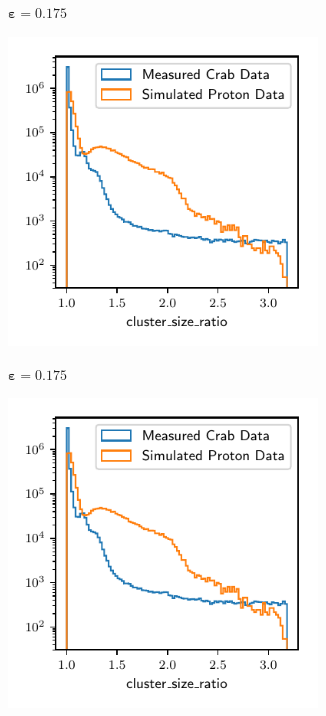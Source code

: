 \begin{figure}
\begin{subfigure}{0.5\textwidth}
  \end{subfigure}
  \begin{subfigure}{0.5\textwidth}
    \centering
    $\symbf{\varepsilon = 0.175}$\par\smallskip
    \includegraphics[width=0.9\textwidth, page=22]{Plots/Epsilon/175_comparison.pdf}
  \end{subfigure}
  \begin{subfigure}{0.5\textwidth}
    \centering
    $\symbf{\varepsilon = 0.175}$\par\smallskip
    \includegraphics[width=0.9\textwidth, page=2]{Plots/Epsilon/175_comparison.pdf}

\end{subfigure}
\end{figure}
